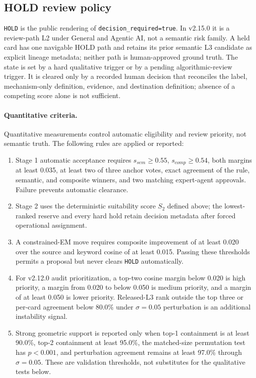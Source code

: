 \documentclass[11pt,a4paper]{article}
\newcommand{\code}[1]{\texttt{#1}}
\begin{document}
\subsection{HOLD review policy}
\label{sec:hold}

\code{HOLD} is the public rendering of \code{decision\_required=true}. In
v2.15.0 it is a review-path L2 under General and Agentic AI, not a semantic risk
family. A held card has one navigable HOLD path and retains its prior semantic
L3 candidate as explicit lineage metadata; neither path is human-approved
ground truth. The state is set by a hard qualitative
trigger or by a pending algorithmic-review trigger. It is cleared only by a
recorded human decision that reconciles the label, mechanism-only definition,
evidence, and destination definition; absence of a competing score alone is
not sufficient.

\paragraph{Quantitative criteria.}
Quantitative measurements control automatic eligibility and review priority,
not semantic truth. The following rules are applied or reported:
\begin{enumerate}[leftmargin=2em]
  \item Stage 1 automatic acceptance requires $s_{sem}\geq0.55$,
  $s_{comp}\geq0.54$, both margins at least 0.035, at least two of three anchor
  votes, exact agreement of the rule, semantic, and composite winners, and two
  matching expert-agent approvals. Failure prevents automatic clearance.
  \item Stage 2 uses the deterministic suitability score $S_2$ defined above;
  the lowest-ranked reserve and every hard hold retain decision metadata after
  forced operational assignment.
  \item A constrained-EM move requires composite improvement of at least 0.020
  over the source and keyword cosine of at least 0.015. Passing these thresholds
  permits a proposal but never clears \code{HOLD} automatically.
  \item For v2.12.0 audit prioritization, a top-two cosine margin below 0.020 is
  high priority, a margin from 0.020 to below 0.050 is medium priority, and a
  margin of at least 0.050 is lower priority. Released-L3 rank outside the top
  three or per-card agreement below 80.0\% under $\sigma=0.05$ perturbation is
  an additional instability signal.
  \item Strong geometric support is reported only when top-1 containment is at
  least 90.0\%, top-2 containment at least 95.0\%, the matched-size permutation
  test has $p<0.001$, and perturbation agreement remains at least 97.0\% through
  $\sigma=0.05$. These are validation thresholds, not substitutes for the
  qualitative tests below.
\end{enumerate}
\end{document}
